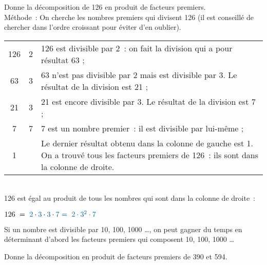 \begin{methode*1}

\begin{exemple*1}
Donne la décomposition de 126 en produit de facteurs premiers.\\[1em]
Méthode : On cherche les nombres premiers qui divisent 126 (il est conseillé de chercher dans l'ordre croissant pour éviter d'en oublier). \\[1em]
\begin{tabularx}{\textwidth}{c|c|X}
 126 & \textcolor{A1}{2} & 126 est divisible par 2 : on fait la division qui a pour résultat 63 ; \\ 
 63 & \textcolor{A1}{3} & 63 n'est pas divisible par 2 mais est divisible par 3. Le résultat de la division est 21 ; \\
 21 & \textcolor{A1}{3} & 21 est encore divisible par 3. Le résultat de la division est 7 ; \\
7 & \textcolor{A1}{7} & 7 est un nombre premier : il est divisible par lui-même ; \\
1 & & Le dernier résultat obtenu dans la colonne de gauche est 1. On a trouvé tous les facteurs premiers de 126 : ils sont dans la colonne de droite. \\
\end{tabularx} \\[1em]
126 est égal au produit de tous les nombres qui sont dans la colonne de droite :
\begin{center} $126 = \textcolor{A1}{2} \cdot \textcolor{A1}{3} \cdot \textcolor{A1}{3} \cdot \textcolor{A1}{7} \textcolor{A1}{= 2 \cdot 3^2 \cdot 7}$ \end{center}
 \end{exemple*1}
 
\begin{remarque}
Si un nombre est divisible par 10, 100, 1000 \ldots, on peut gagner du temps en déterminant d'abord les facteurs premiers qui composent 10, 100, 1000 \ldots
\end{remarque}


\exercice  
Donne la décomposition en produit de facteurs premiers de 390 et 594.

\vspace{3em}

 \end{methode*1}
 
 
